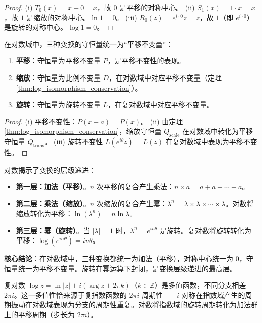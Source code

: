 \begin{proof}
(i) $T_0(x) = x + 0 = x$，故 $0$ 是平移的对称中心。
(ii) $S_1(x) = 1 \cdot x = x$，故 $1$ 是缩放的对称中心。$\ln 1 = 0$。
(iii) $R_0(z) = e^{i\cdot 0}z = z$，故 $1$（即 $e^{i\cdot 0}$）是旋转的对称中心。$\log 1 = 0$。
\end{proof}

\begin{proposition}[对数视角下守恒量的统一]\label{prop:log_conservation_unification}
在对数域中，三种变换的守恒量统一为“平移不变量”：
\begin{enumerate}[label=(\roman*)]
    \item \textbf{平移}：守恒量为平移不变量 $P$，是平移不变性的表现。
    \item \textbf{缩放}：守恒量为比例不变量 $D$，在对数域中对应平移不变量（定理 \ref{thm:log_isomorphism_conservation}）。
    \item \textbf{旋转}：守恒量为旋转不变量 $L$，在复对数域中对应平移不变量。
\end{enumerate}
\end{proposition}

\begin{proof}
(i) 平移不变性：$P(x+a) = P(x)$。
(ii) 由定理 \ref{thm:log_isomorphism_conservation}，缩放守恒量 $Q_{\text{scale}}$ 在对数域中转化为平移守恒量 $Q_{\text{trans}}$。
(iii) 旋转不变性 $L(e^{i\theta}z) = L(z)$ 在复对数域中表现为平移不变性。
\end{proof}

\begin{remark}[变换的层级递进与对数]\label{rem:hierarchy_logarithm}
对数揭示了变换的层级递进：
\begin{itemize}
    \item \textbf{第一层：加法（平移）}。$n$ 次平移的复合产生乘法：$n \times a = a + a + \cdots + a$。
    \item \textbf{第二层：乘法（缩放）}。$n$ 次缩放的复合产生幂：$\lambda^n = \lambda \times \lambda \times \cdots \times \lambda$。对数将缩放转化为平移：$\ln(\lambda^n) = n\ln\lambda$。
    \item \textbf{第三层：幂（旋转）}。当 $|\lambda| = 1$ 时，$\lambda^n = e^{in\theta}$ 是旋转。复对数将旋转转化为平移：$\log(e^{in\theta}) = in\theta$。
\end{itemize}
\textbf{核心结论}：在对数域中，三种变换都统一为加法（平移），对称中心统一为 $0$，守恒量统一为平移不变量。旋转在幂运算下封闭，是变换层级递进的最高层。
\end{remark}

\begin{proposition}\label{prop:complex_log_i_symmetry}
复对数 $\log z = \ln|z| + i(\arg z + 2\pi k)$（$k \in \mathbb{Z}$）是多值函数，不同分支相差 $2\pi i$。这一多值性恰来源于复指数函数的 $2\pi i$-周期性——$i$ 对称在指数域产生的周期振动在对数域表现为分支的周期性重复。对数将指数域的旋转周期转化为加法群上的平移周期（步长为 $2\pi i$）。
\end{proposition}

